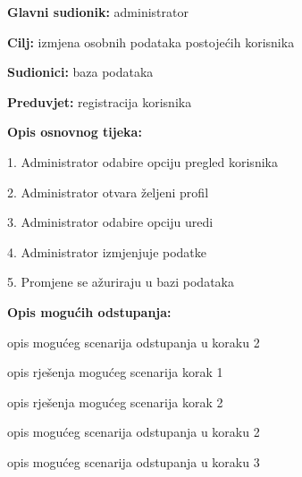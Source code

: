 					\noindent {}
					\begin{packed_item}
						
						\item \textbf{Glavni sudionik: }administrator
						\item  \textbf{Cilj:} izmjena osobnih podataka postojećih korisnika
						\item  \textbf{Sudionici:} baza podataka
						\item  \textbf{Preduvjet:} registracija korisnika
						\item  \textbf{Opis osnovnog tijeka:}
						
						\item[] \begin{packed_enum}
							
							\item 1. Administrator odabire opciju pregled korisnika
							\item 2. Administrator otvara željeni profil
							\item 3. Administrator odabire opciju uredi
							\item 4. Administrator izmjenjuje podatke
							\item 5. Promjene se ažuriraju u bazi podataka
						\end{packed_enum}
						
						\item  \textbf{Opis mogućih odstupanja:}
						
						\item[] \begin{packed_item}
							
							\item[2.a] opis mogućeg scenarija odstupanja u koraku 2
							\item[] \begin{packed_enum}
								
								\item opis rješenja mogućeg scenarija korak 1
								\item opis rješenja mogućeg scenarija korak 2
								
							\end{packed_enum}
							\item[2.b] opis mogućeg scenarija odstupanja u koraku 2
							\item[3.a] opis mogućeg scenarija odstupanja  u koraku 3
							
						\end{packed_item}
					\end{packed_item}
					

